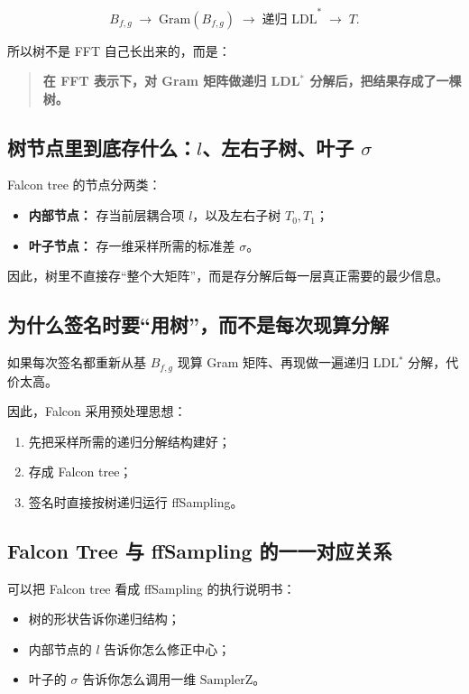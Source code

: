 \documentclass[11pt,a4paper]{ctexart}
\begin{document}
\[
B_{f,g}
\;\longrightarrow\;
\mathrm{Gram}(B_{f,g})
\;\longrightarrow\;
\text{递归 LDL}^*
\;\longrightarrow\;
T.
\]

所以树不是 FFT 自己长出来的，而是：

\begin{quote}
\textbf{在 FFT 表示下，对 Gram 矩阵做递归 LDL\(^*\) 分解后，把结果存成了一棵树。}
\end{quote}

\subsection{树节点里到底存什么：\(l\)、左右子树、叶子 \(\sigma\)}

Falcon tree 的节点分两类：

\begin{itemize}
    \item \textbf{内部节点：} 存当前层耦合项 \(l\)，以及左右子树 \(T_0,T_1\)；
    \item \textbf{叶子节点：} 存一维采样所需的标准差 \(\sigma\)。
\end{itemize}

因此，树里不直接存“整个大矩阵”，而是存分解后每一层真正需要的最少信息。

\subsection{为什么签名时要“用树”，而不是每次现算分解}

如果每次签名都重新从基 \(B_{f,g}\) 现算 Gram 矩阵、再现做一遍递归 LDL\(^*\) 分解，代价太高。

因此，Falcon 采用预处理思想：

\begin{enumerate}
    \item 先把采样所需的递归分解结构建好；
    \item 存成 Falcon tree；
    \item 签名时直接按树递归运行 ffSampling。
\end{enumerate}

\subsection{Falcon Tree 与 ffSampling 的一一对应关系}

可以把 Falcon tree 看成 ffSampling 的执行说明书：

\begin{itemize}
    \item 树的形状告诉你递归结构；
    \item 内部节点的 \(l\) 告诉你怎么修正中心；
    \item 叶子的 \(\sigma\) 告诉你怎么调用一维 \(\mathrm{SamplerZ}\)。
\end{itemize}
\end{document}
